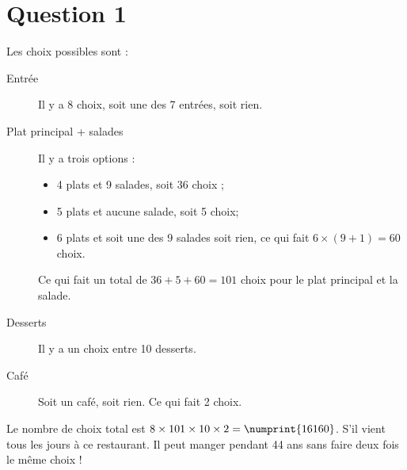 \vfil
\section*{Question 1}
Les choix possibles sont : 
\begin{description}
	\item[Entrée] Il y a 8 choix, soit une des 7 entrées, soit rien.
	\item[Plat principal + salades] Il y a trois options :
	\begin{itemize}
		\item 4 plats et 9 salades, soit 36 choix ;
		\item 5 plats et aucune salade, soit 5 choix;
		\item 6 plats et soit une des 9 salades soit rien, ce qui fait $6 \times (9 + 1) = 60$ choix.
	\end{itemize}
	Ce qui fait un total de $36+5+60 = 101$ choix pour le plat principal et la salade.
	\item[Desserts] Il y a un choix entre 10 desserts.
	\item[Café] Soit un café, soit rien. Ce qui fait 2 choix.
\end{description}

Le nombre de choix total est $ 8 \times 101 \times 10 \times 2 = \numprint{16160}$. S’il vient tous les jours à ce restaurant. Il peut manger pendant 44 ans sans faire deux fois le même choix !